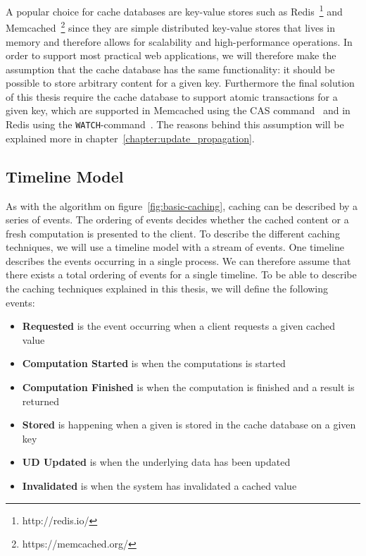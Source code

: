 A popular choice for cache databases are key-value stores such as Redis~\footnote{http://redis.io/} and Memcached~\footnote{https://memcached.org/} since they are simple distributed key-value stores that lives in memory and therefore allows for scalability and high-performance operations. In order to support most practical web applications, we will therefore make the assumption that the cache database has the same functionality: it should be possible to store arbitrary content for a given key. Furthermore the final solution of this thesis require the cache database to support atomic transactions for a given key, which are supported in Memcached using the CAS command~\cite{docs:memcached-protocol} and in Redis using the \verb$WATCH$-command~\cite{docs:redis-transactions}. The reasons behind this assumption will be explained more in chapter~\ref{chapter:update_propagation}.



\subsection{Timeline Model}
\label{subsec:timeline_model}

As with the algorithm on figure~\ref{fig:basic-caching}, caching can be described by a series of events. The ordering of events decides whether the cached content or a fresh computation is presented to the client. To describe the different caching techniques, we will use a timeline model with a stream of events. One timeline describes the events occurring in a single process. We can therefore assume that there exists a total ordering of events for a single timeline. To be able to describe the caching techniques explained in this thesis, we will define the following events:

\begin{itemize}
  \item \textbf{Requested} is the event occurring when a client requests a given cached value
  \item \textbf{Computation Started} is when the computations is started
  \item \textbf{Computation Finished} is when the computation is finished and a result is returned
  \item \textbf{Stored} is happening when a given is stored in the cache database on a given key
  \item \textbf{UD Updated} is when the underlying data has been updated
  \item \textbf{Invalidated} is when the system has invalidated a cached value
\end{itemize}

